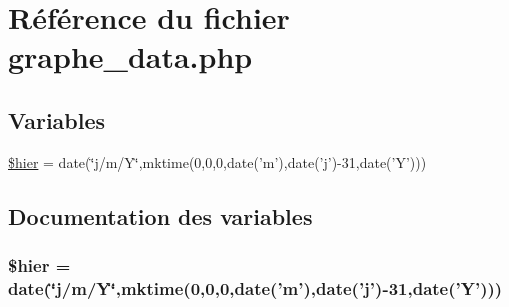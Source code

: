 \hypertarget{graphe__data_8php}{
\section{R\'{e}f\'{e}rence du fichier graphe\_\-data.php}
\label{graphe__data_8php}
}
\subsection*{Variables}
\begin{CompactItemize}
\item 
\hyperlink{graphe__data_8php_a0}{\$hier} = date(\char`\"{}j/m/Y\char`\"{},mktime(0,0,0,date('m'),date('j')-31,date('Y')))
\end{CompactItemize}


\subsection{Documentation des variables}
\hypertarget{graphe__data_8php_a0}{
\subsubsection[\$hier]{\setlength{\rightskip}{0pt plus 5cm}\$hier = date(\char`\"{}j/m/Y\char`\"{},mktime(0,0,0,date('m'),date('j')-31,date('Y')))}}
\label{graphe__data_8php_a0}



